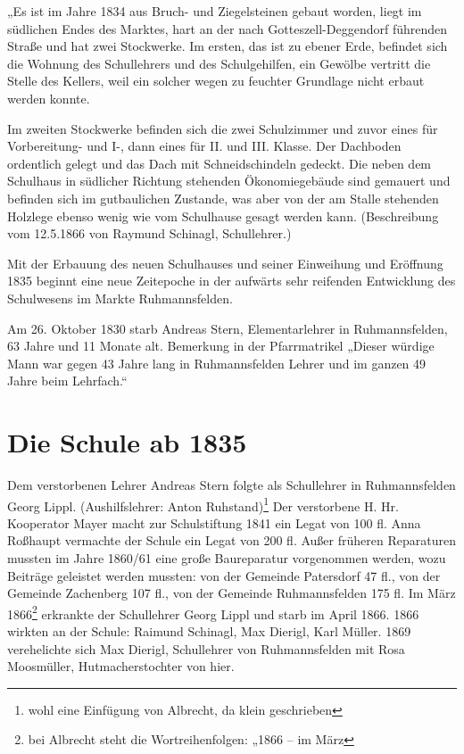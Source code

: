 \documentclass[12pt,a4paper]{book}
\begin{document}
„Es ist im Jahre 1834 aus Bruch- und Ziegelsteinen gebaut worden, liegt im
südlichen Endes des Marktes, hart an der nach Gotteszell-Deggendorf führenden
Straße und hat zwei Stockwerke. Im ersten, das ist zu ebener Erde, befindet sich
die Wohnung des Schullehrers und des Schulgehilfen, ein Gewölbe vertritt die
Stelle des Kellers, weil ein solcher wegen zu feuchter Grundlage nicht erbaut
werden konnte.

Im zweiten Stockwerke befinden sich die zwei Schulzimmer und zuvor eines für
Vorbereitung- und I-, dann eines für II. und III. Klasse. Der Dachboden
ordentlich gelegt und das Dach mit Schneidschindeln gedeckt. Die neben dem
Schulhaus in südlicher Richtung stehenden Ökonomiegebäude sind gemauert und
befinden sich im gutbaulichen Zustande, was aber von der am Stalle stehenden
Holzlege ebenso wenig wie vom Schulhause gesagt werden kann. (Beschreibung vom
12.5.1866 von Raymund Schinagl, Schullehrer.)

Mit der Erbauung des neuen Schulhauses und seiner Einweihung und Eröffnung 1835
beginnt eine neue Zeitepoche in der aufwärts sehr reifenden Entwicklung des
Schulwesens im Markte Ruhmannsfelden.

Am 26. Oktober 1830 starb Andreas Stern, Elementarlehrer in Ruhmannsfelden, 63
Jahre und 11 Monate alt. Bemerkung in der Pfarrmatrikel „Dieser würdige Mann war
gegen 43 Jahre lang in Ruhmannsfelden Lehrer und im ganzen 49 Jahre beim
Lehrfach.“

\section[Die Schule ab 1835]{Die Schule ab
1835\protect\footnotemark{}\protect{}}

Dem verstorbenen Lehrer Andreas Stern folgte als Schullehrer in Ruhmannsfelden
Georg Lippl. (Aushilfslehrer: Anton Ruhstand)\footnote{wohl eine Einfügung von
Albrecht, da klein geschrieben} Der verstorbene H. Hr. Kooperator Mayer macht
zur Schulstiftung 1841 ein Legat von 100 fl. Anna Roßhaupt vermachte der Schule
ein Legat von 200 fl. Außer früheren Reparaturen mussten im Jahre 1860/61 eine
große Baureparatur vorgenommen werden, wozu Beiträge geleistet werden mussten:
von der Gemeinde Patersdorf 47 fl., von der Gemeinde Zachenberg 107 fl., von der
Gemeinde Ruhmannsfelden 175 fl. Im März 1866\footnote{bei Albrecht steht die
Wortreihenfolgen: „1866 – im März} erkrankte der Schullehrer Georg Lippl und
starb im April 1866. 1866 wirkten an der Schule: Raimund Schinagl, Max Dierigl,
Karl Müller. 1869 verehelichte sich Max Dierigl, Schullehrer von Ruhmannsfelden
mit Rosa Moosmüller, Hutmacherstochter von hier.
\end{document}
